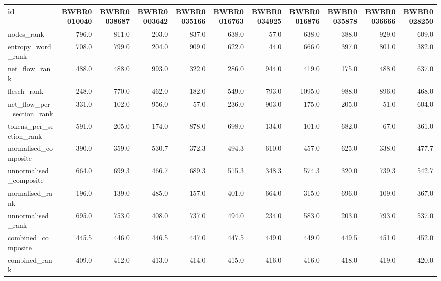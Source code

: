 \begin{tabular}{lrrrrrrrrrr}
\toprule
id & BWBR0010040 & BWBR0038687 & BWBR0003642 & BWBR0035166 & BWBR0016763 & BWBR0034925 & BWBR0016876 & BWBR0035878 & BWBR0036666 & BWBR0028250 \\
\midrule
nodes\_rank & 796.0 & 811.0 & 203.0 & 837.0 & 638.0 & 57.0 & 638.0 & 388.0 & 929.0 & 609.0 \\
\cline{1-11}
entropy\_word\_rank & 708.0 & 799.0 & 204.0 & 909.0 & 622.0 & 44.0 & 666.0 & 397.0 & 801.0 & 382.0 \\
\cline{1-11}
net\_flow\_rank & 488.0 & 488.0 & 993.0 & 322.0 & 286.0 & 944.0 & 419.0 & 175.0 & 488.0 & 637.0 \\
\cline{1-11}
flesch\_rank & 248.0 & 770.0 & 462.0 & 182.0 & 549.0 & 793.0 & 1095.0 & 988.0 & 896.0 & 468.0 \\
\cline{1-11}
net\_flow\_per\_section\_rank & 331.0 & 102.0 & 956.0 & 57.0 & 236.0 & 903.0 & 175.0 & 205.0 & 51.0 & 604.0 \\
\cline{1-11}
tokens\_per\_section\_rank & 591.0 & 205.0 & 174.0 & 878.0 & 698.0 & 134.0 & 101.0 & 682.0 & 67.0 & 361.0 \\
\cline{1-11}
normalised\_composite & 390.0 & 359.0 & 530.7 & 372.3 & 494.3 & 610.0 & 457.0 & 625.0 & 338.0 & 477.7 \\
\cline{1-11}
unnormalised\_composite & 664.0 & 699.3 & 466.7 & 689.3 & 515.3 & 348.3 & 574.3 & 320.0 & 739.3 & 542.7 \\
\cline{1-11}
normalised\_rank & 196.0 & 139.0 & 485.0 & 157.0 & 401.0 & 664.0 & 315.0 & 696.0 & 109.0 & 367.0 \\
\cline{1-11}
unnormalised\_rank & 695.0 & 753.0 & 408.0 & 737.0 & 494.0 & 234.0 & 583.0 & 203.0 & 793.0 & 537.0 \\
\cline{1-11}
combined\_composite & 445.5 & 446.0 & 446.5 & 447.0 & 447.5 & 449.0 & 449.0 & 449.5 & 451.0 & 452.0 \\
\cline{1-11}
combined\_rank & 409.0 & 412.0 & 413.0 & 414.0 & 415.0 & 416.0 & 416.0 & 418.0 & 419.0 & 420.0 \\
\cline{1-11}
\bottomrule
\end{tabular}
